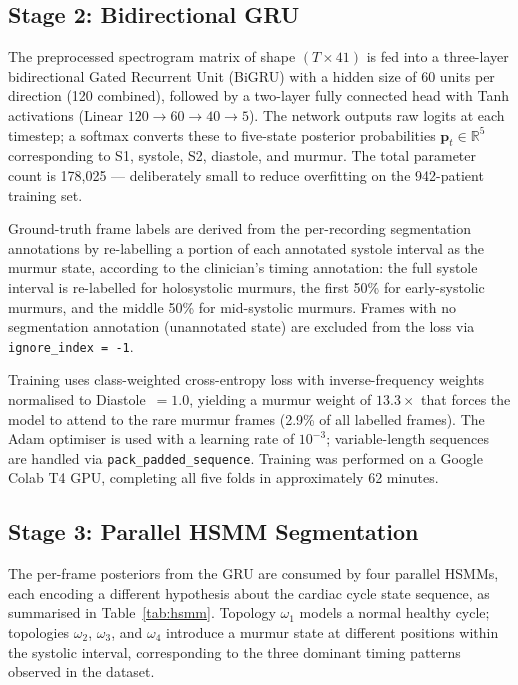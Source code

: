 \documentclass[conference]{IEEEtran}
\begin{document}
\subsection{Stage 2: Bidirectional GRU}

The preprocessed spectrogram matrix of shape $(T \times 41)$ is
fed into a three-layer bidirectional Gated Recurrent Unit (BiGRU)
with a hidden size of 60 units per direction (120 combined), followed
by a two-layer fully connected head with Tanh activations
(Linear $120 \to 60 \to 40 \to 5$). The network outputs raw logits
at each timestep; a softmax converts these to five-state posterior
probabilities $\mathbf{p}_t \in \mathbb{R}^5$ corresponding to
S1, systole, S2, diastole, and murmur. The total parameter count
is 178,025 --- deliberately small to reduce overfitting on the
942-patient training set.

Ground-truth frame labels are derived from the per-recording
segmentation annotations by re-labelling a portion of each annotated
systole interval as the murmur state, according to the clinician's
timing annotation: the full systole interval is re-labelled for
holosystolic murmurs, the first 50\% for early-systolic murmurs, and
the middle 50\% for mid-systolic murmurs. Frames with no segmentation
annotation (unannotated state) are excluded from the loss via
\texttt{ignore\_index~=~-1}.

Training uses class-weighted cross-entropy loss with inverse-frequency
weights normalised to Diastole~$= 1.0$, yielding a murmur weight
of $13.3\times$ that forces the model to attend to the rare murmur
frames (2.9\% of all labelled frames). The Adam optimiser is used
with a learning rate of $10^{-3}$; variable-length sequences are
handled via \texttt{pack\_padded\_sequence}. Training was performed
on a Google Colab T4 GPU, completing all five folds in approximately
62 minutes.

\subsection{Stage 3: Parallel HSMM Segmentation}

The per-frame posteriors from the GRU are consumed by four parallel
HSMMs, each encoding a different hypothesis about the cardiac cycle
state sequence, as summarised in Table~\ref{tab:hsmm}. Topology
$\omega_1$ models a normal healthy cycle; topologies $\omega_2$,
$\omega_3$, and $\omega_4$ introduce a murmur state at different
positions within the systolic interval, corresponding to the three
dominant timing patterns observed in the dataset.
\end{document}
